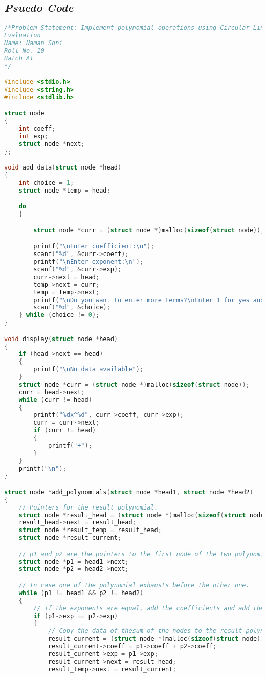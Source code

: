 \documentclass{article}
\begin{document}
\subsection{\textbf{\textit{Psuedo Code}}}
\begin{lstlisting}[language = c++, caption = Input Code]
/*Problem Statement: Implement polynomial operations using Circular Linked List: Create, Display, Addition and
Evaluation 
Name: Naman Soni 
Roll No. 10
Batch A1
*/

#include <stdio.h>
#include <string.h>
#include <stdlib.h>

struct node
{
    int coeff;
    int exp;
    struct node *next;
};

void add_data(struct node *head)
{
    int choice = 1;
    struct node *temp = head;

    do
    {

        struct node *curr = (struct node *)malloc(sizeof(struct node));

        printf("\nEnter coefficient:\n");
        scanf("%d", &curr->coeff);
        printf("\nEnter exponent:\n");
        scanf("%d", &curr->exp);
        curr->next = head;
        temp->next = curr;
        temp = temp->next;
        printf("\nDo you want to enter more terms?\nEnter 1 for yes and 0 for no\n");
        scanf("%d", &choice);
    } while (choice != 0);
}

void display(struct node *head)
{
    if (head->next == head)
    {
        printf("\nNo data available");
    }
    struct node *curr = (struct node *)malloc(sizeof(struct node));
    curr = head->next;
    while (curr != head)
    {
        printf("%dx^%d", curr->coeff, curr->exp);
        curr = curr->next;
        if (curr != head)
        {
            printf("+");
        }
    }
    printf("\n");
}

struct node *add_polynomials(struct node *head1, struct node *head2)
{
    // Pointers for the result polynomial.
    struct node *result_head = (struct node *)malloc(sizeof(struct node));
    result_head->next = result_head;
    struct node *result_temp = result_head;
    struct node *result_current;

    // p1 and p2 are the pointers to the first node of the two polynomials.
    struct node *p1 = head1->next;
    struct node *p2 = head2->next;

    // In case one of the polynomial exhausts before the other one.
    while (p1 != head1 && p2 != head2)
    {
        // if the exponents are equal, add the coefficients and add the node to the result polynomial.
        if (p1->exp == p2->exp)
        {
            // Copy the data of thesum of the nodes to the result polynomial.
            result_current = (struct node *)malloc(sizeof(struct node));
            result_current->coeff = p1->coeff + p2->coeff;
            result_current->exp = p1->exp;
            result_current->next = result_head;
            result_temp->next = result_current;


\end{lstlisting}
\end{document}
